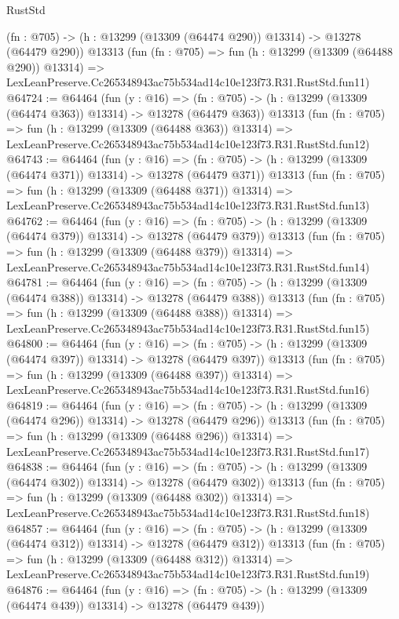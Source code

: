 \begin{lexlean}{RustStd}
\begin{coremodule}
    (fn : @705) -> (h : @13299 (@13309 (@64474 @290)) @13314) -> @13278 (@64479 @290))
    @13313
    (fun (fn : @705) =>
    fun (h : @13299 (@13309 (@64488 @290)) @13314) =>
    LexLeanPreserve.Cc265348943ac75b534ad14c10e123f73.R31.RustStd.fun11)
@64724 := @64464
    (fun (y : @16) =>
    (fn : @705) -> (h : @13299 (@13309 (@64474 @363)) @13314) -> @13278 (@64479 @363))
    @13313
    (fun (fn : @705) =>
    fun (h : @13299 (@13309 (@64488 @363)) @13314) =>
    LexLeanPreserve.Cc265348943ac75b534ad14c10e123f73.R31.RustStd.fun12)
@64743 := @64464
    (fun (y : @16) =>
    (fn : @705) -> (h : @13299 (@13309 (@64474 @371)) @13314) -> @13278 (@64479 @371))
    @13313
    (fun (fn : @705) =>
    fun (h : @13299 (@13309 (@64488 @371)) @13314) =>
    LexLeanPreserve.Cc265348943ac75b534ad14c10e123f73.R31.RustStd.fun13)
@64762 := @64464
    (fun (y : @16) =>
    (fn : @705) -> (h : @13299 (@13309 (@64474 @379)) @13314) -> @13278 (@64479 @379))
    @13313
    (fun (fn : @705) =>
    fun (h : @13299 (@13309 (@64488 @379)) @13314) =>
    LexLeanPreserve.Cc265348943ac75b534ad14c10e123f73.R31.RustStd.fun14)
@64781 := @64464
    (fun (y : @16) =>
    (fn : @705) -> (h : @13299 (@13309 (@64474 @388)) @13314) -> @13278 (@64479 @388))
    @13313
    (fun (fn : @705) =>
    fun (h : @13299 (@13309 (@64488 @388)) @13314) =>
    LexLeanPreserve.Cc265348943ac75b534ad14c10e123f73.R31.RustStd.fun15)
@64800 := @64464
    (fun (y : @16) =>
    (fn : @705) -> (h : @13299 (@13309 (@64474 @397)) @13314) -> @13278 (@64479 @397))
    @13313
    (fun (fn : @705) =>
    fun (h : @13299 (@13309 (@64488 @397)) @13314) =>
    LexLeanPreserve.Cc265348943ac75b534ad14c10e123f73.R31.RustStd.fun16)
@64819 := @64464
    (fun (y : @16) =>
    (fn : @705) -> (h : @13299 (@13309 (@64474 @296)) @13314) -> @13278 (@64479 @296))
    @13313
    (fun (fn : @705) =>
    fun (h : @13299 (@13309 (@64488 @296)) @13314) =>
    LexLeanPreserve.Cc265348943ac75b534ad14c10e123f73.R31.RustStd.fun17)
@64838 := @64464
    (fun (y : @16) =>
    (fn : @705) -> (h : @13299 (@13309 (@64474 @302)) @13314) -> @13278 (@64479 @302))
    @13313
    (fun (fn : @705) =>
    fun (h : @13299 (@13309 (@64488 @302)) @13314) =>
    LexLeanPreserve.Cc265348943ac75b534ad14c10e123f73.R31.RustStd.fun18)
@64857 := @64464
    (fun (y : @16) =>
    (fn : @705) -> (h : @13299 (@13309 (@64474 @312)) @13314) -> @13278 (@64479 @312))
    @13313
    (fun (fn : @705) =>
    fun (h : @13299 (@13309 (@64488 @312)) @13314) =>
    LexLeanPreserve.Cc265348943ac75b534ad14c10e123f73.R31.RustStd.fun19)
@64876 := @64464
    (fun (y : @16) =>
    (fn : @705) -> (h : @13299 (@13309 (@64474 @439)) @13314) -> @13278 (@64479 @439))

\end{coremodule}
\end{lexlean}
